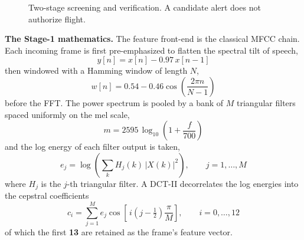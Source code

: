 \documentclass[12pt,a4paper]{report}
\begin{document}
\begin{figure}[htbp]
\centering
{}
\vspace{0.3cm}
\caption{Two-stage screening and verification. A candidate alert does not authorize flight.}
\label{fig:pipeline}
\end{figure}

\textbf{The Stage-1 mathematics.} The feature front-end is the
classical MFCC chain. Each incoming frame is first pre-emphasized to
flatten the spectral tilt of speech,
\begin{equation}
\label{eq:preemph}
y[n] = x[n] - 0.97\,x[n-1]
\end{equation}
then windowed with a Hamming window of length $N$,
\begin{equation}
\label{eq:hamming}
w[n] = 0.54 - 0.46\cos\!\left(\frac{2\pi n}{N-1}\right)
\end{equation}
before the FFT. The power spectrum is pooled by a bank of $M$
triangular filters spaced uniformly on the mel scale,
\begin{equation}
\label{eq:mel}
m = 2595\,\log_{10}\!\left(1 + \frac{f}{700}\right)
\end{equation}
and the log energy of each filter output is taken,
\begin{equation}
\label{eq:fbank}
e_j = \log\!\left(\sum_{k} H_j(k)\,\lvert X(k)\rvert^2\right),
\qquad j = 1,\dots,M
\end{equation}
where $H_j$ is the $j$-th triangular filter. A DCT-II decorrelates the
log energies into the cepstral coefficients
\begin{equation}
\label{eq:dct}
c_i = \sum_{j=1}^{M} e_j
\cos\!\left[\,i\left(j - \tfrac{1}{2}\right)\frac{\pi}{M}\right],
\qquad i = 0,\dots,12
\end{equation}
of which the first \textbf{13} are retained as the frame's feature
vector.
\end{document}
